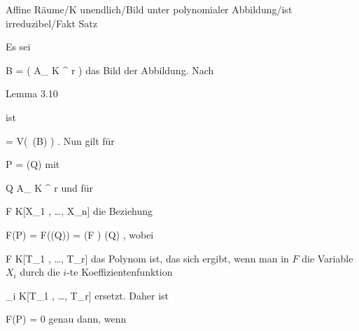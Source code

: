 {Affine Räume/K unendlich/Bild unter polynomialer Abbildung/ist irreduzibel/Fakt}
{Satz}
{}
{



\faktsituation {}
\faktzusatz {}
\faktzusatz {}





}
{





Es sei

\mavergleichskette
{\vergleichskette
{ B
}
{ = }{ \varphi( { {\mathbb A}_{  K }^{  r   } } )
}
{  }{
}
{    }{
}
{   }{
}
}
{}{}{}
das Bild der Abbildung. Nach

Lemma 3.10

ist

\mavergleichskettedisp
{\vergleichskette
{ 
}
{ =} { V( \,(B) )
}
{ } {
}
{ } {
}
{ } {
}
}
{}{}{.}
Nun gilt für

\mavergleichskette
{\vergleichskette
{ P
}
{ = }{ \varphi(Q)
}
{  }{
}
{    }{
}
{   }{
}
}
{}{}{}
mit

\mavergleichskette
{\vergleichskette
{ Q
}
{ \in }{ { {\mathbb A}_{  K }^{  r   } }
}
{  }{
}
{    }{
}
{   }{
}
}
{}{}{}
und für

\mavergleichskette
{\vergleichskette
{ F
}
{ \in }{ K[X_1 , \ldots , X_n]
}
{  }{
}
{    }{
}
{   }{
}
}
{}{}{}
die Beziehung

\mavergleichskettedisp
{\vergleichskette
{ F(P)
}
{ =} { F(\varphi(Q))
}
{ =} { (F \circ \varphi  )  (Q)
}
{ } {
}
{ } {
}
}
{}{}{,}
wobei

\mavergleichskette
{\vergleichskette
{ F \circ \varphi
}
{ \in }{ K[T_1 , \ldots ,  T_r]
}
{  }{
}
{    }{
}
{   }{
}
}
{}{}{}
das Polynom ist, das sich ergibt, wenn man in $F$ die Variable $X_i$ durch die $i$-te Koeffizientenfunktion

\mavergleichskette
{\vergleichskette
{ \varphi_i
}
{ \in }{ K[T_1 , \ldots , T_r]
}
{  }{
}
{    }{
}
{   }{
}
}
{}{}{}
ersetzt. Daher ist

\mavergleichskette
{\vergleichskette
{ F(P)
}
{ = }{ 0
}
{  }{
}
{    }{
}
{   }{
}
}
{}{}{}
genau dann, wenn

}
